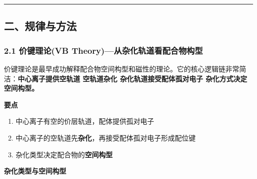 \begin{center}\rule{0.5\linewidth}{0.5pt}\end{center}

\subsection{二、规律与方法}\label{ux4e8cux89c4ux5f8bux4e0eux65b9ux6cd5}

\subsubsection{2.1 价键理论(VB Theory)---从杂化轨道看配合物构型}\label{ux4ef7ux952eux7406ux8bbavb-theoryux4eceux6742ux5316ux8f68ux9053ux770bux914dux5408ux7269ux6784ux578b}

价键理论是最早成功解释配合物空间构型和磁性的理论。它的核心逻辑链非常简洁：\textbf{中心离子提供空轨道 \箭 空轨道杂化 \箭 杂化轨道接受配体孤对电子 \箭 杂化方式决定空间构型。}

\textbf{要点}

\begin{enumerate}
\def\labelenumi{\arabic{enumi}.}
\tightlist
\item
  中心离子有空的价层轨道，配体提供孤对电子
\item
  中心离子的空轨道先\textbf{杂化}，再接受配体孤对电子形成配位键
\item
  杂化类型决定配合物的\textbf{空间构型}
\end{enumerate}

\textbf{杂化类型与空间构型}

